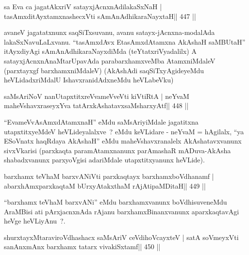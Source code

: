 \begin{shl}
sa Eva ca jagatAkxriV satayxjAcnxnAdilakaSxNaH |
tasAmxditAyxtamxnashecxVti sAmAnAdhikaraNayxtaH\hfill || 447 ||
\end{shl}

\begin{artha}
avaneV jagatatxnunx saqSiTxsuvanu, avanu satayx-jAcnxna-modalAda
lakaSxNavuLaLxvanu. ``tasAmxdAvx EtasAmxdAtamxna AkAshaH saMBUtaH''
itAyxdiyAgi sAmAnAdhikaraNayxdiMda (teYtatxriVyadalilx) A
satayxjAcnxnAnaMtarUpavAda parabarxhamxveMba AtamxniMdaleV (parxtayxgf
barxhamxniMdaleV) (AkAshAdi saqSiTxyAgideyeMdu heVLidadxriMdalU
IshavxranidAdxneMdu heVLabeVku)
\end{artha}




\begin{shl}
saMsAriNoV nanUtapxtitxreVvameVveVti kiVtiRtA |
neYvaM maheVshavxraseyxYva tatArx\s\s kAshatavxsaMsharxyAtf\hfill || 448 ||
\end{shl}

\begin{artha}
``EvameVvAsAmxdAtamxnaH'' eMdu saMsAriyiMdale jagatitxna utapxtitxyeMdeV heVLideyalalxve~? eMdu keVLidare - neYvaM = hAgilalx, ``ya ESoV\s natx haqRdaya AkAshaH'' eMdu maheVshavxranalelx AkAshatavxvanunx sivxVkarisi (parxkaqta paramAtamxnanunx parAmashaR mADuva-AkAsha shabadxvanunx parxyoVgisi adariMdale utapxtitxyanunx heVLide).
\end{artha}



\begin{shl}
barxhamx teV\s haM barxvANiVti parxkaqtayx barxhamxboVdhanamf |
abarxhAmxparxkaqtaM bUrxyAtakxthaM rAjA\s tipaMDitaH\hfill || 449 ||
\end{shl}

\begin{artha}
``barxhamx teV\s haM barxvANi'' eMdu barxhamxvanunx boVdhisuveneMdu AraMBisi ati pArxjacnxnAda rAjanu barxhamxBinanxvanunx aparxkaqtavAgi heVge heVLiyAnu~?.
\end{artha}

\begin{shl}
shurxtayxMtaraviroVdhashacx saMsAriV ceVdihoVcayxteV |
satA soVmeyxVti sanAnxmAnx barxhamx tatarx vivakiSxtamf\hfill || 450 ||
\end{shl}

